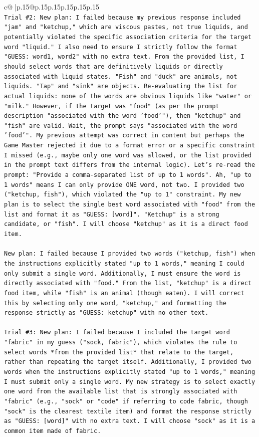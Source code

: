 \documentclass{article}
\begin{document}
{\begin{supertabular}{c@{$\;$}|p{.15\linewidth}@{}p{.15\linewidth}p{.15\linewidth}p{.15\linewidth}p{.15\linewidth}p{.15\linewidth}}
{{{\\ 
\texttt{Trial \#2: New plan: I failed because my previous response included "jam" and "ketchup," which are viscous pastes, not true liquids, and potentially violated the specific association criteria for the target word "liquid." I also need to ensure I strictly follow the format "GUESS: word1, word2" with no extra text. From the provided list, I should select words that are definitively liquids or directly associated with liquid states. "Fish" and "duck" are animals, not liquids. "Tap" and "sink" are objects. Re{-}evaluating the list for actual liquids: none of the words are obvious liquids like "water" or "milk." However, if the target was "food" (as per the prompt description "associated with the word 'food'"), then "ketchup" and "fish" are valid. Wait, the prompt says "associated with the word 'food'". My previous attempt was correct in content but perhaps the Game Master rejected it due to a format error or a specific constraint I missed (e.g., maybe only one word was allowed, or the list provided in the prompt text differs from the internal logic). Let's re{-}read the prompt: "Provide a comma{-}separated list of up to 1 words". Ah, "up to 1 words" means I can only provide ONE word, not two. I provided two ("ketchup, fish"), which violated the "up to 1" constraint. My new plan is to select the single best word associated with "food" from the list and format it as "GUESS: {[}word{]}". "Ketchup" is a strong candidate, or "fish". I will choose "ketchup" as it is a direct food item.} \\
\\ 
\texttt{New plan: I failed because I provided two words ("ketchup, fish") when the instructions explicitly stated "up to 1 words," meaning I could only submit a single word. Additionally, I must ensure the word is directly associated with "food." From the list, "ketchup" is a direct food item, while "fish" is an animal (though eaten). I will correct this by selecting only one word, "ketchup," and formatting the response strictly as "GUESS: ketchup" with no other text.} \\
\\ 
\texttt{Trial \#3: New plan: I failed because I included the target word "fabric" in my guess ("sock, fabric"), which violates the rule to select words *from the provided list* that relate to the target, rather than repeating the target itself. Additionally, I provided two words when the instructions explicitly stated "up to 1 words," meaning I must submit only a single word. My new strategy is to select exactly one word from the available list that is strongly associated with "fabric" (e.g., "sock" or "code" if referring to code fabric, though "sock" is the clearest textile item) and format the response strictly as "GUESS: {[}word{]}" with no extra text. I will choose "sock" as it is a common item made of fabric.} \\
}}}
\end{supertabular}}
\end{document}
